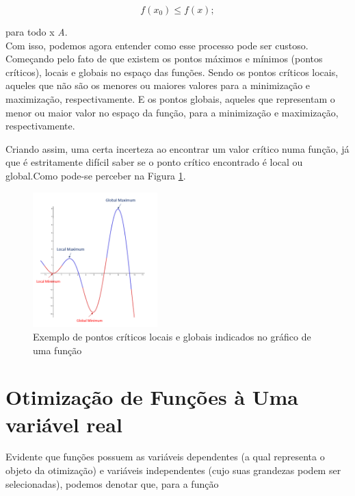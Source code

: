 			\begin{equation}
				f(x_0) \leq f(x);
			\end{equation}

		para todo x \in \textit{A}.\\


Com isso, podemos agora entender como esse processo pode ser custoso.
Começando pelo fato de que existem os pontos máximos e mínimos
(pontos críticos), locais e globais no espaço das funções. Sendo os pontos
críticos locais, aqueles que não são os menores ou maiores valores para a
minimização e maximização, respectivamente. E os pontos globais, aqueles que
representam o menor ou maior valor no espaço da função, para a minimização e
maximização, respectivamente.

Criando assim, uma certa incerteza ao encontrar um valor crítico numa função,
já que é estritamente difícil saber se o ponto crítico encontrado é local ou
global.Como pode-se perceber na Figura
\ref{grafico_local_global_pontosCriticos}.


\begin{figure}[h]
	\includegraphics[width=0.43\textwidth]
	{src/grafico_local_global_pontosCriticos.png}
	\centering
	\caption{Exemplo de pontos críticos locais e globais indicados no gráfico
	de uma função}
	\label{grafico_local_global_pontosCriticos}
\end{figure}




\section{{Otimização de Funções à Uma variável real}}

\hspace{0.8cm}

Evidente que funções possuem as variáveis dependentes (a qual representa o
objeto da otimização) e variáveis independentes (cujo suas grandezas podem ser
selecionadas), podemos denotar que, para a função

